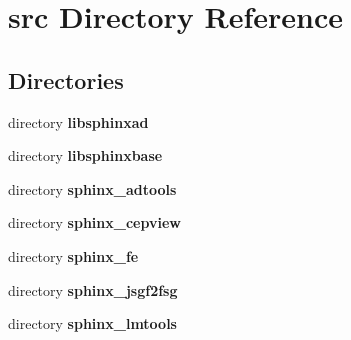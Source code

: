 \section{src Directory Reference}
\label{dir_68267d1309a1af8e8297ef4c3efbcdba}
\subsection*{Directories}
\begin{DoxyCompactItemize}
\item 
directory {\bf libsphinxad}
\item 
directory {\bf libsphinxbase}
\item 
directory {\bf sphinx\-\_\-adtools}
\item 
directory {\bf sphinx\-\_\-cepview}
\item 
directory {\bf sphinx\-\_\-fe}
\item 
directory {\bf sphinx\-\_\-jsgf2fsg}
\item 
directory {\bf sphinx\-\_\-lmtools}
\end{DoxyCompactItemize}
